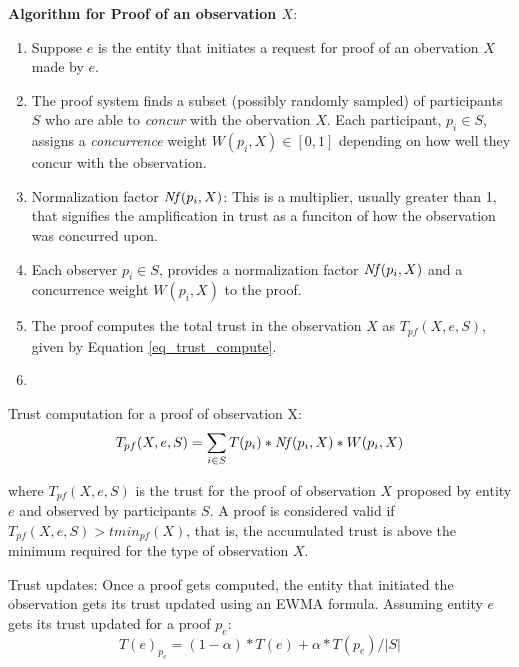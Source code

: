 \noindent
{\bf Algorithm for Proof of an observation $X$}:
\begin{enumerate}
    \item Suppose $e$ is the entity that initiates a request for proof of an obervation $X$ made by $e$.
    \item The proof system finds a subset (possibly randomly sampled) of participants $S$ who are able
        to {\it concur} with the obervation $X$. Each participant, $p_i \in S$, assigns a {\em concurrence} weight
        $W(p_i, X) \in [0,1]$ depending on how well they concur with the observation.
    \item Normalization factor $\mathit{Nf}(p_i, X)$: This is a multiplier, usually greater than 1, that signifies the
        amplification in trust as a funciton of how the observation was concurred upon. 
    \item Each observer $p_i \in S$, provides a normalization factor $\mathit{Nf}(p_i, X)$ and a concurrence weight $W(p_i, X)$
        to the proof.
    \item The proof computes the total trust in the observation $X$ as $T_{pf}(X, e, S)$, given by Equation
        \ref{eq_trust_compute}.
    \item 
\end{enumerate}

\noindent
Trust computation for a proof of observation X:
\begin{equation*}
    \label{eq_trust_compute}
    T_{pf}(X, e, S) = \sum_{i\in S} T(p_i) * \mathit{Nf}(p_i, X) * W(p_i, X)
\end{equation*}

where $T_{pf}(X, e, S)$ is the trust for the proof of observation $X$ proposed by entity $e$ and observed by
participants $S$. A proof is considered valid if $T_{pf}(X, e, S) > tmin_{pf}(X)$, that is, the accumulated trust is
above the minimum required for the type of observation $X$.

\noindent
Trust updates: Once a proof gets computed, the entity that initiated the observation gets its trust updated using an
EWMA formula. Assuming entity $e$ gets its trust updated for a proof $p_e$:
\begin{equation*}
    T(e)_{p_e} = (1 - \alpha) * T(e) + \alpha * T(p_e) / |S|
\end{equation*}

